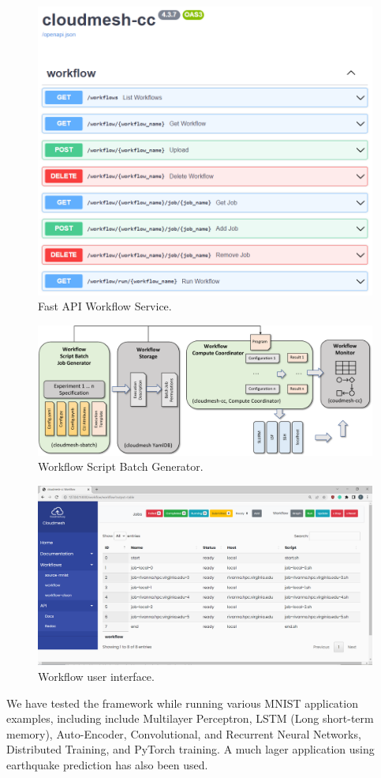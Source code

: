 \documentclass[utf8]{FrontiersinVancouver} %
\begin{document}
\begin{figure}[htb]
\centering\includegraphics[width=0.7\columnwidth]{images/fastapi-service.png}
\caption{Fast API Workflow Service.}
\label{fig:fastapi-cc}
\end{figure}


\begin{figure}[htb]
    \centering
    \includegraphics[width=0.70\columnwidth]{images/cloudmesh-sbatch-new.pdf}
    \caption{Workflow Script Batch Generator.}
    \label{fig:cm-sbatch}
\end{figure}

\begin{figure}[htb]
    \centering
    \includegraphics[width=0.70\columnwidth]{images/cc-1.png}
    \caption{Workflow user interface. }
    \label{fig:cc-3}
\end{figure}


We have tested the framework while running various MNIST application
examples, including include Multilayer Perceptron, LSTM (Long
short-term memory), Auto-Encoder, Convolutional, and Recurrent Neural
Networks, Distributed Training, and PyTorch training.  A much lager
application using earthquake prediction has also been used.
\end{document}
